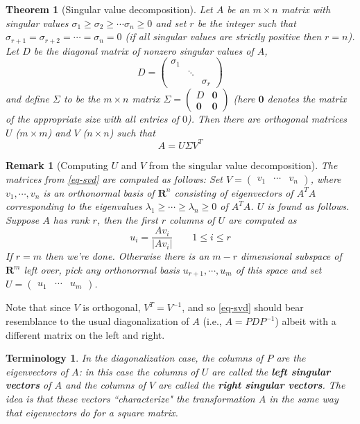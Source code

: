 \documentclass[12pt]{article}
\numberwithin{equation}{subsection}
\numberwithin{figure}{subsection}
\newtheorem{thm}[subsection]{Theorem}
\theoremstyle{note}
\newtheorem{remark}[subsection]{Remark}
\newtheorem{terminology}[subsection]{Terminology}
\newcommand{\R}{\mathbf{R}}
\newcommand\m[1]{\begin{pmatrix}#1\end{pmatrix}}
\begin{document}
\begin{thm}[Singular value decomposition]Let $A$ be an $m\times n$ matrix with singular values $\sigma_1\geq \sigma_2\geq \cdots\sigma_n\geq 0$ and set $r$ be the integer such that $\sigma_{r+1}=\sigma_{r+2}=\cdots=\sigma_n=0$ (if all singular values are strictly positive then $r=n$). Let $D$ be the diagonal matrix of \textit{nonzero} singular values of $A$, \[D=\m{ \sigma_1 & & \\  & \ddots & \\ && \sigma_r}\] and define $\Sigma$ to be the $m\times n$ matrix $\Sigma= \m{ D & \mathbf{0} \\ \mathbf{0} & \mathbf{0}}$ (here $\mathbf{0}$ denotes the matrix of the appropriate size with all entries of $0$). Then there are orthogonal matrices $U$ ($m\times m$) and $V$ ($n\times n$) such that \begin{equation} A=U\Sigma V^T\label{eq-svd} \end{equation}
\end{thm}
\begin{remark}[Computing $U$ and $V$ from the singular value decomposition] The matrices from \eqref{eq-svd} are computed as follows: Set $V=\m{v_1 & \cdots & v_n}$, where $v_1,\cdots,v_n$ is an orthonormal basis of $\R^n$ consisting of eigenvectors of $A^TA$ corresponding to the eigenvalues $\lambda_1\geq \cdots \geq \lambda_n\geq 0$ of $A^TA$. $U$ is found as follows. Suppose $A$ has rank $r$, then the first $r$ columns of $U$ are computed as \begin{equation} u_i=\dfrac{Av_i}{|Av_i|} \qquad 1\leq i\leq r\end{equation} If $r=m$ then we're done. Otherwise there is an $m-r$ dimensional subspace of $\R^m$ left over, pick \textit{any} orthonormal basis $u_{r+1},\cdots,u_m$ of this space and set $U=\m{ u_1 & \cdots & u_m}$.\end{remark}

Note that since $V$ is orthogonal, $V^T=V^{-1}$, and so \eqref{eq-svd} should bear resemblance to the usual diagonalization of $A$ (i.e., $A=PDP^{-1}$) albeit with a different matrix on the left and right. 

\begin{terminology} In the diagonalization case, the columns of $P$ are the eigenvectors of $A$: in this case the columns of $U$ are called the \textbf{left singular vectors} of $A$ and the columns of $V$ are called the \textbf{right singular vectors}. The idea is that these vectors ``characterize" the transformation $A$ in the same way that eigenvectors do for a square matrix. 
\end{terminology}
\end{document}
